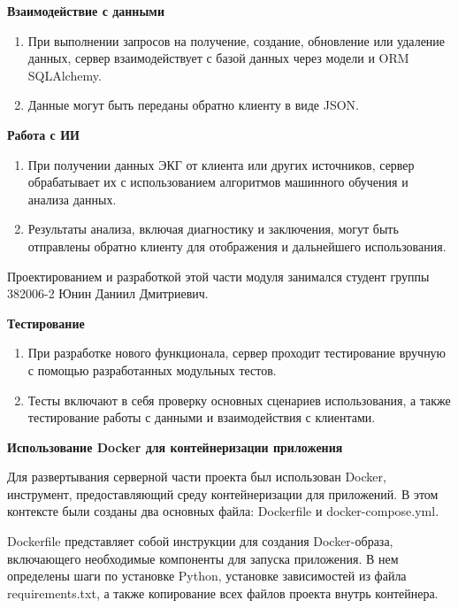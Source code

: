 \documentclass[12pt, russian]{extarticle}
\begin{document}
\begin{spacing}{1.5}
\par \noindent \textbf{Взаимодействие с данными}
\begin{enumerate}
    \item При выполнении запросов на получение, создание, обновление или удаление данных, сервер взаимодействует с базой данных через модели и ORM SQLAlchemy.
    \item Данные могут быть переданы обратно клиенту в виде JSON.
\end{enumerate}

\par \noindent \textbf{Работа с ИИ}
\begin{enumerate}
    \item При получении данных ЭКГ от клиента или других источников, сервер обрабатывает их с использованием алгоритмов машинного обучения и анализа данных.
    \item Результаты анализа, включая диагностику и заключения, могут быть отправлены обратно клиенту для отображения и дальнейшего использования.
\end{enumerate}

Проектированием и разработкой этой части модуля занимался студент группы 382006-2 Юнин Даниил Дмитриевич.

\par \noindent \textbf{Тестирование}
\begin{enumerate}
    \item При разработке нового функционала, сервер проходит тестирование вручную с помощью разработанных модульных тестов.
    \item Тесты включают в себя проверку основных сценариев использования, а также тестирование работы с данными и взаимодействия с клиентами.
\end{enumerate}

\par \noindent \textbf{Использование Docker для контейнеризации приложения}


Для развертывания серверной части проекта был использован Docker, инструмент, предоставляющий среду контейнеризации для приложений. В этом контексте были созданы два основных файла: Dockerfile и docker-compose.yml.

Dockerfile представляет собой инструкции для создания Docker-образа, включающего необходимые компоненты для запуска приложения. В нем определены шаги по установке Python, установке зависимостей из файла requirements.txt, а также копирование всех файлов проекта внутрь контейнера.


\end{spacing}
\end{document}
